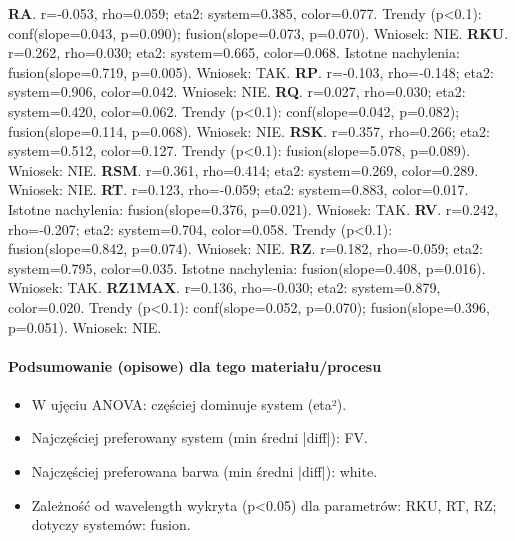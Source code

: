 \documentclass[
  10pt,
]{article}
\begin{document}
\textbf{RA}. r=-0.053, rho=0.059; eta2: system=0.385, color=0.077.
Trendy (p\textless0.1): conf(slope=0.043, p=0.090); fusion(slope=0.073,
p=0.070). Wniosek: NIE. \textbf{RKU}. r=0.262, rho=0.030; eta2:
system=0.665, color=0.068. Istotne nachylenia: fusion(slope=0.719,
p=0.005). Wniosek: TAK. \textbf{RP}. r=-0.103, rho=-0.148; eta2:
system=0.906, color=0.042. Wniosek: NIE. \textbf{RQ}. r=0.027,
rho=0.030; eta2: system=0.420, color=0.062. Trendy (p\textless0.1):
conf(slope=0.042, p=0.082); fusion(slope=0.114, p=0.068). Wniosek: NIE.
\textbf{RSK}. r=0.357, rho=0.266; eta2: system=0.512, color=0.127.
Trendy (p\textless0.1): fusion(slope=5.078, p=0.089). Wniosek: NIE.
\textbf{RSM}. r=0.361, rho=0.414; eta2: system=0.269, color=0.289.
Wniosek: NIE. \textbf{RT}. r=0.123, rho=-0.059; eta2: system=0.883,
color=0.017. Istotne nachylenia: fusion(slope=0.376, p=0.021). Wniosek:
TAK. \textbf{RV}. r=0.242, rho=-0.207; eta2: system=0.704, color=0.058.
Trendy (p\textless0.1): fusion(slope=0.842, p=0.074). Wniosek: NIE.
\textbf{RZ}. r=0.182, rho=-0.059; eta2: system=0.795, color=0.035.
Istotne nachylenia: fusion(slope=0.408, p=0.016). Wniosek: TAK.
\textbf{RZ1MAX}. r=0.136, rho=-0.030; eta2: system=0.879, color=0.020.
Trendy (p\textless0.1): conf(slope=0.052, p=0.070); fusion(slope=0.396,
p=0.051). Wniosek: NIE.

\paragraph{Podsumowanie (opisowe) dla tego materiału/procesu}
\begin{itemize}
\item W ujęciu ANOVA: częściej dominuje system (eta²).
\item Najczęściej preferowany system (min średni |diff|): FV.
\item Najczęściej preferowana barwa (min średni |diff|): white.
\item Zależność od wavelength wykryta (p<0.05) dla parametrów: RKU, RT, RZ; dotyczy systemów: fusion.
\end{itemize}
\end{document}
